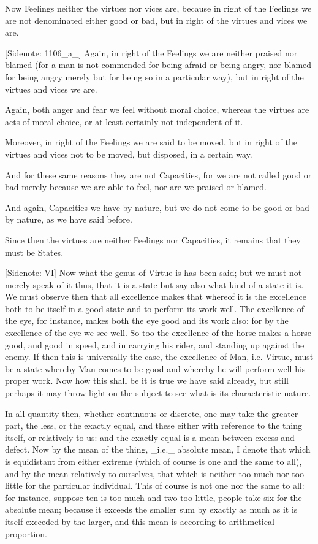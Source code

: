 Now Feelings neither the virtues nor vices are, because in right of the
Feelings we are not denominated either good or bad, but in right of the
virtues and vices we are.

[Sidenote: 1106_a_] Again, in right of the Feelings we are neither
praised nor blamed (for a man is not commended for being afraid or
being angry, nor blamed for being angry merely but for being so in a
particular way), but in right of the virtues and vices we are.

Again, both anger and fear we feel without moral choice, whereas the
virtues are acts of moral choice, or at least certainly not independent
of it.

Moreover, in right of the Feelings we are said to be moved, but in right
of the virtues and vices not to be moved, but disposed, in a certain
way.

And for these same reasons they are not Capacities, for we are not
called good or bad merely because we are able to feel, nor are we
praised or blamed.

And again, Capacities we have by nature, but we do not come to be good
or bad by nature, as we have said before.

Since then the virtues are neither Feelings nor Capacities, it remains
that they must be States.

[Sidenote: VI] Now what the genus of Virtue is has been said; but we
must not merely speak of it thus, that it is a state but say also what
kind of a state it is. We must observe then that all excellence makes
that whereof it is the excellence both to be itself in a good state and
to perform its work well. The excellence of the eye, for instance, makes
both the eye good and its work also: for by the excellence of the eye
we see well. So too the excellence of the horse makes a horse good, and
good in speed, and in carrying his rider, and standing up against the
enemy. If then this is universally the case, the excellence of Man, i.e.
Virtue, must be a state whereby Man comes to be good and whereby he will
perform well his proper work. Now how this shall be it is true we have
said already, but still perhaps it may throw light on the subject to see
what is its characteristic nature.

In all quantity then, whether continuous or discrete, one may take the
greater part, the less, or the exactly equal, and these either with
reference to the thing itself, or relatively to us: and the exactly
equal is a mean between excess and defect. Now by the mean of the thing,
_i.e._ absolute mean, I denote that which is equidistant from either
extreme (which of course is one and the same to all), and by the mean
relatively to ourselves, that which is neither too much nor too little
for the particular individual. This of course is not one nor the same to
all: for instance, suppose ten is too much and two too little, people
take six for the absolute mean; because it exceeds the smaller sum by
exactly as much as it is itself exceeded by the larger, and this mean is
according to arithmetical proportion.


